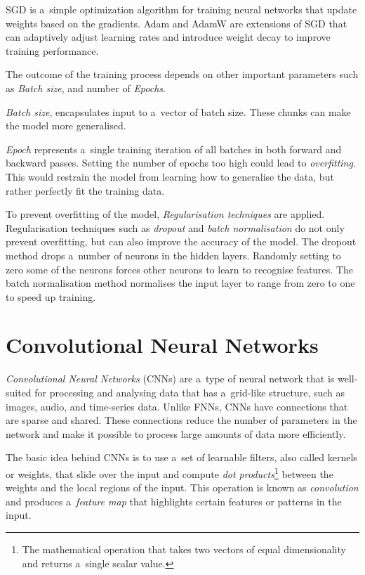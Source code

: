     SGD is a~simple optimization algorithm for training neural networks that update weights based on the gradients. Adam and AdamW are extensions of SGD that can adaptively adjust learning rates and introduce weight decay to improve training performance.

    The outcome of the training process depends on other important parameters \cite{aaltonn} such as \textit{Batch size}, and number of \textit{Epochs}. 
    
    \textit{Batch size}, encapsulates input to a~vector of batch size. These chunks can make the model more generalised.

    \textit{Epoch} represents a~single training iteration of all batches in both forward and backward passes. Setting the number of epochs too high could lead to \textit{overfitting}. This would restrain the model from learning how to generalise the data, but rather perfectly fit the training data.

    To prevent overfitting of the model, \textit{Regularisation techniques} are applied. Regularisation techniques such as \textit{dropout} and \textit{batch normalisation} do not only prevent overfitting, but can also improve the accuracy of the model. The dropout method drops a~number of neurons in the hidden layers. Randomly setting to zero some of the neurons forces other neurons to learn to recognise features. The batch normalisation method normalises the input layer to range from zero to one to speed up training.  


\section{Convolutional Neural Networks}

\textit{Convolutional Neural Networks} (CNNs) \cite{Goodfellow-et-al-2016, aggarwal2018neural} are a~type of neural network that is well-suited for processing and analysing data that has a~grid-like structure, such as images, audio, and time-series data. Unlike FNNs, CNNs have connections that are sparse and shared. These connections reduce the number of parameters in the network and make it possible to process large amounts of data more efficiently.

The basic idea behind CNNs is to use a~set of learnable filters, also called kernels or weights, that slide over the input and compute \textit{dot products}\footnote{The mathematical operation that takes two vectors of equal dimensionality and returns a~single scalar value.} between the weights and the local regions of the input. This operation is known as \textit{convolution} and produces a~\textit{feature map} that highlights certain features or patterns in the input. 

